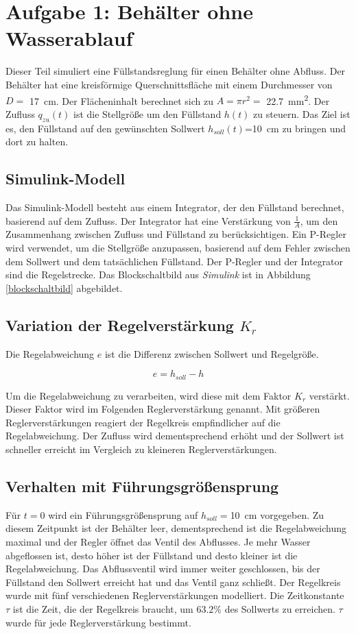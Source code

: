 \section{Aufgabe 1: Behälter ohne Wasserablauf}
Dieser Teil simuliert eine Füllstandsreglung für einen Behälter ohne Abfluss. Der Behälter hat eine kreisförmige Querschnittsfläche mit einem Durchmesser von $D=$ \SI{17}{cm}. Der Flächeninhalt berechnet sich zu $A=\pi r^2=$ \SI{22.7}{mm^2}. Der Zufluss $q_{zu}(t)$ ist die Stellgröße um den Füllstand $h(t)$ zu steuern. Das Ziel ist es, den Füllstand auf den gewünschten Sollwert $h_{soll}(t)$=\SI{10}{cm} zu bringen und dort zu halten.

\subsection{Simulink-Modell}
Das Simulink-Modell besteht aus einem Integrator, der den Füllstand berechnet, basierend auf dem Zufluss. Der Integrator hat eine Verstärkung von $\frac{1}{A}$, um den Zusammenhang zwischen Zufluss und Füllstand zu berücksichtigen. Ein P-Regler wird verwendet, um die Stellgröße anzupassen, basierend auf dem Fehler zwischen dem Sollwert und dem tatsächlichen Füllstand. Der P-Regler und der Integrator sind die Regelstrecke. Das Blockschaltbild aus \textit{Simulink} ist in Abbildung \ref{blockschaltbild} abgebildet.  

\subsection{Variation der Regelverstärkung $K_r$}
Die Regelabweichung $e$ ist die Differenz zwischen Sollwert und Regelgröße.

\begin{equation}
    e=h_{soll}-h
\end{equation}

Um die Regelabweichung zu verarbeiten, wird diese mit dem Faktor $K_r$ verstärkt. Dieser Faktor wird im Folgenden Reglerverstärkung genannt. Mit größeren Reglerverstärkungen reagiert der Regelkreis empfindlicher auf die Regelabweichung. Der Zufluss wird dementsprechend erhöht und der Sollwert ist schneller erreicht im Vergleich zu kleineren Reglerverstärkungen.

\subsection{Verhalten mit Führungsgrößensprung}
Für $t=0$ wird ein Führungsgrößensprung auf $h_{soll}=$\SI{10}{cm} vorgegeben. Zu diesem Zeitpunkt ist der Behälter leer, dementsprechend ist die Regelabweichung maximal und der Regler öffnet das Ventil des Abflusses. Je mehr Wasser abgeflossen ist, desto höher ist der Füllstand und desto kleiner ist die Regelabweichung. Das Abflussventil wird immer weiter geschlossen, bis der Füllstand den Sollwert erreicht hat und das Ventil ganz schließt. Der Regelkreis wurde mit fünf verschiedenen Reglerverstärkungen modelliert. Die Zeitkonstante $\tau $ ist die Zeit, die der Regelkreis braucht, um $63.2\% $ des Sollwerts zu erreichen. $\tau$ wurde für jede Reglerverstärkung bestimmt.

